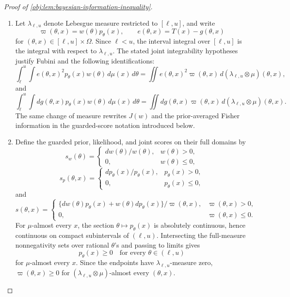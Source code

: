 \begin{proof}[Proof of \cref{obj:lem:bayesian-information-inequality}]
\begin{enumerate}
\item Let \(\lambda_{\ell,u}\) denote Lebesgue measure restricted to \([\ell,u]\), and write
\[
\varpi(\theta,x)=w(\theta)p_\theta(x),\qquad
e(\theta,x)=T(x)-g(\theta,x)
\]
for \((\theta,x)\in[\ell,u]\times\Omega\).  Since \(\ell<u\), the interval integral over
\([\ell,u]\) is the integral with respect to \(\lambda_{\ell,u}\).  The stated joint
integrability hypotheses justify Fubini and the following identifications:
\[
\int_\ell^u\int e(\theta,x)^2p_\theta(x)w(\theta)\,d\mu(x)\,d\theta
 =
\iint e(\theta,x)^2\varpi(\theta,x)\,d(\lambda_{\ell,u}\otimes\mu)(\theta,x),
\]
and
\[
\int_\ell^u\int dg(\theta,x)p_\theta(x)w(\theta)\,d\mu(x)\,d\theta
 =
\iint dg(\theta,x)\varpi(\theta,x)\,d(\lambda_{\ell,u}\otimes\mu)(\theta,x).
\]
The same change of measure rewrites \(J(w)\) and the prior-averaged Fisher
information in the guarded-score notation introduced below. %

\item Define the guarded prior, likelihood, and joint scores on their full domains by
\[
s_w(\theta)=
\begin{cases}
dw(\theta)/w(\theta),& w(\theta)>0,\\
0,& w(\theta)\le 0,
\end{cases}
\]
\[
s_p(\theta,x)=
\begin{cases}
dp_\theta(x)/p_\theta(x),& p_\theta(x)>0,\\
0,& p_\theta(x)\le 0,
\end{cases}
\]
and
\[
s(\theta,x)=
\begin{cases}
\{dw(\theta)p_\theta(x)+w(\theta)dp_\theta(x)\}/\varpi(\theta,x),
& \varpi(\theta,x)>0,\\
0,& \varpi(\theta,x)\le 0.
\end{cases}
\]
For \(\mu\)-almost every \(x\), the section \(\theta\mapsto p_\theta(x)\) is absolutely
continuous, hence continuous on compact subintervals of \((\ell,u)\).  Intersecting the
full-measure nonnegativity sets over rational \(\theta\)'s and passing to limits gives
\[
p_\theta(x)\ge 0
\quad\text{for every }\theta\in(\ell,u)
\]
for \(\mu\)-almost every \(x\).  Since the endpoints have
\(\lambda_{\ell,u}\)-measure zero, \(\varpi(\theta,x)\ge0\) for
\((\lambda_{\ell,u}\otimes\mu)\)-almost every \((\theta,x)\). %


\end{enumerate}
\end{proof}
